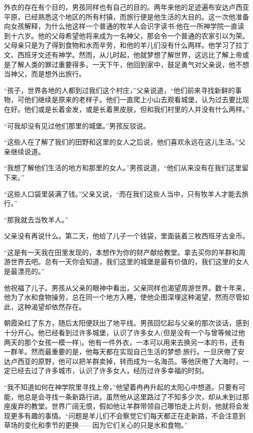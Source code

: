\documentclass[twoside,openany]{book}
\begin{document}
外衣的存在有个目的，男孩同样也有自己的目的。两年来他的足迹遍布安达卢西亚平原，已经熟悉这个地区的所有村镇，而旅行便是他生活的大目的。这一次他准备向女孩解释，为什么他这样一个普通的牧羊人会识字读书:他在一所神学院一直读到十六岁。他的父母希望他将来成为一名神父，那会令一个普通的农家引以为荣。父母亲只是为了得到食物和水而辛劳，和他的羊儿们没有什么两样。他学习了拉丁文、西班牙文还有神学。然而，从儿时起，他就梦想了解世界，这远比了解上帝或是了解人类的罪过重要得多。一天下午，他回到家中，鼓足勇气对父亲说，他不想当神父，而是想外出旅行。

“孩子，世界各地的人都到过我们这个村庄，”父亲说道，“他们前来寻找新鲜的事物，可他们继续是原来的老样子。他们一直爬上小山去观看城堡，认为过去要比现在好。他们或是长着金发，或是长着黑皮肤，但和我们村里的人并没有什么两样。”

“可我却没有见过他们那里的城堡。”男孩反驳说。

“这些人在了解了我们的田野和这里的女人之后说，他们喜欢永远在这儿生活。”父亲继续说道。

“我想了解他们生活的地方和那里的女人。”男孩说道，“他们从来没有在我们这里留下来。”

“这些人口袋里装满了钱。”父亲又说，“而在我们这些人当中，只有牧羊人才能去旅行。”

“那我就去当牧羊人。”

父亲没有再说什么。第二天，他给了儿子一个钱袋，里面装着三枚西班牙古金币。

“这是有一天我在田里发现的，本想作为你的财产献给教堂。拿去买你的羊群和周游世界去吧。总有一天你会知道，我们这里的城堡是最有价值的，我们这里的女人是最漂亮的。”

他祝福了儿子。男孩从父亲的眼神中看出，父亲同样也渴望周游世界。数十年来，他为了水和食物操劳，总在同一个地方入睡，使他企图深埋这种渴望，然而尽管如此，这种渴望却依然存在。

朝霞染红了东方，随后太阳便跃出了地平线。男孩回忆起与父亲的那次谈话，感到十分开心。他已经看到过许多城堡，认识了许多女人(但是没有一个与曾等候过他两天的那个女孩一模一样)。他有一件外衣，一本可以用来去换另一本的书，还有一群羊。然而最重要的是，他每天都在实现自己生活的梦想:旅行。一旦厌倦了安达卢西亚的原野，他可以把羊群卖掉，转而成为一名海员。等他厌倦了大海时，一定已经去过了许多城市，认识了许多女人，经历过许多幸福的时刻。

“我不知道如何在神学院里寻找上帝，”他望着冉冉升起的太阳心中想道。只要有可能，他总是会寻找一条新路行进。虽然他从这里路过了不知多少次，却从未到过那座废弃的教堂。世界广阔无恨，假如他让羊群带领自己哪怕走上片刻，他就将会发现更多有趣的事情。“问题是羊儿们不会察觉它们每天都正在走新路，不会注意到草场的变化和季节的更换——因为它们关心的只是水和食物。”
\end{document}
